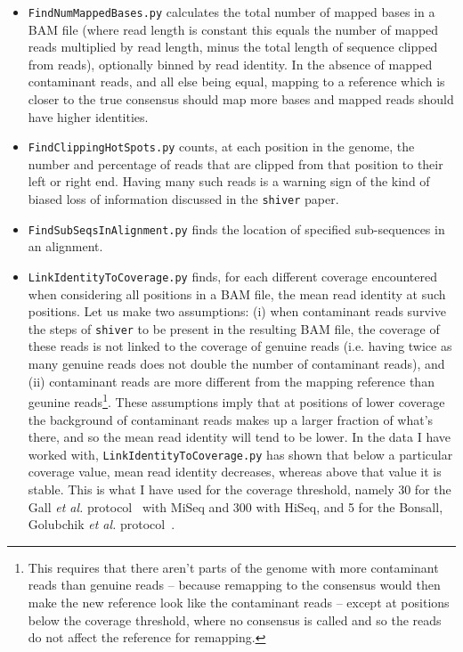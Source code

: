 \documentclass{article}
\newcommand{\shiv}{\c{shiver}\xspace}
\let\c\texttt
\begin{document}
\begin{itemize}
\item \c{FindNumMappedBases.py} calculates the total number of mapped bases in a BAM file (where read length is constant this equals the number of mapped reads multiplied by read length, minus the total length of sequence clipped from reads), optionally binned by read identity.
In the absence of mapped contaminant reads, and all else being equal, mapping to a reference which is closer to the true consensus should map more bases and mapped reads should have higher identities.

\item \c{FindClippingHotSpots.py} counts, at each position in the genome, the number and percentage of reads that are clipped from that position to their left or right end.
Having many such reads is a warning sign of the kind of biased loss of information discussed in the \shiv paper.

\item \c{FindSubSeqsInAlignment.py} finds the location of specified sub-sequences in an alignment.

\item \c{LinkIdentityToCoverage.py} finds, for each different coverage encountered when considering all positions in a BAM file, the mean read identity at such positions.
Let us make two assumptions: (i) when contaminant reads survive the steps of \shiv to be present in the resulting BAM file, the coverage of these reads is not linked to the coverage of genuine reads (i.e. having twice as many genuine reads does not double the number of contaminant reads), and (ii) contaminant reads are more different from the mapping reference than geunine reads\footnote{
This requires that there aren't parts of the genome with more contaminant reads than genuine reads -- because remapping to the consensus would then make the new reference look like the contaminant reads -- except at positions below the coverage threshold, where no consensus is called and so the reads do not affect the reference for remapping.}.
These assumptions imply that at positions of lower coverage the background of contaminant reads makes up a larger fraction of what's there, and so the mean read identity will tend to be lower.
In the data I have worked with, \c{LinkIdentityToCoverage.py} has shown that below a particular coverage value, mean read identity decreases, whereas above that value it is stable.
This is what I have used for the coverage threshold, namely 30 for the Gall {\it et al.} protocol~\cite{Gall01122012} with MiSeq and 300 with HiSeq, and 5 for the Bonsall, Golubchik {\it et al.} protocol~\cite{Bonsall397083}.


\end{itemize}
\end{document}
